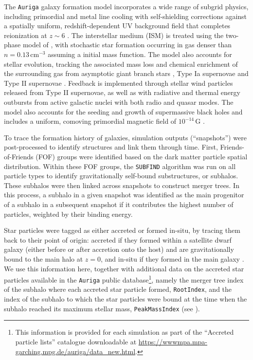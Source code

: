 The \texttt{Auriga} galaxy formation model incorporates a wide range of subgrid physics, including primordial and metal line cooling with self-shielding corrections against a spatially uniform, redshift-dependent UV background field \citep{FaucherGiguere2009} that completes reionization at $z\sim6$ \citep{Vogelsberger2013}. The interstellar medium (ISM) is treated using the two-phase model of \cite{Springel2003}, with stochastic star formation occurring in gas denser than $n=0.13\,\mathrm{cm}^{-3}$ assuming a \cite{Chabrier2003} initial mass function. The model also accounts for stellar evolution, tracking the associated mass loss and chemical enrichment of the surrounding gas from asymptotic giant branch stars \citep{Karakas2010}, Type Ia supernovae \citep{Thielemann2003,Travaglio2004} and Type II supernovae \citep{Portinari1998}. Feedback is implemented through stellar wind particles released from Type II supernovae, as well as with radiative and thermal energy outbursts from active galactic nuclei with both radio and quasar modes.
The model also accounts for the seeding and growth of supermassive black holes \citep{Springel2005b} and includes a uniform, comoving primordial magnetic field of $10^{-14}\,\mathrm{G}$ \citep{Pakmor2013}.

To trace the formation history of galaxies, simulation outputs (``snapshots'') were post-processed to identify structures and link them through time. First, Friends-of-Friends (FOF) groups were identified based on the dark matter particle spatial distribution. Within these FOF groups, the \texttt{SUBFIND} algorithm \citep{Springel2001} was run on all particle types to identify gravitationally self-bound substructures, or subhalos. These subhalos were then linked across snapshots to construct merger trees. In this process, a subhalo in a given snapshot was identified as the main progenitor of a subhalo in a subsequent snapshot if it contributes the highest number of particles, weighted by their binding energy. 

Star particles were tagged as either accreted or formed in-situ, by tracing them back to their point of origin: accreted if they formed within a satellite dwarf galaxy (either before or after accretion onto the host) and are gravitationally bound to the main halo at $z=0$, and in-situ if they formed in the main galaxy \citep{Monachesi2019}. We use this information here, together with additional data on the accreted star particles available in the \texttt{Auriga} public database\footnote{This information is provided for each simulation as part of the ``Accreted particle lists'' catalogue downloadable at \url{https://wwwmpa.mpa-garching.mpg.de/auriga/data_new.html}.}, namely the merger tree index of the subhalo where each accreted star particle formed, \texttt{RootIndex}, and the index of the subhalo to which the star particles were bound at the time when the subhalo reached its maximum stellar mass, \texttt{PeakMassIndex} (see \citealt{Grand2024a}). 

